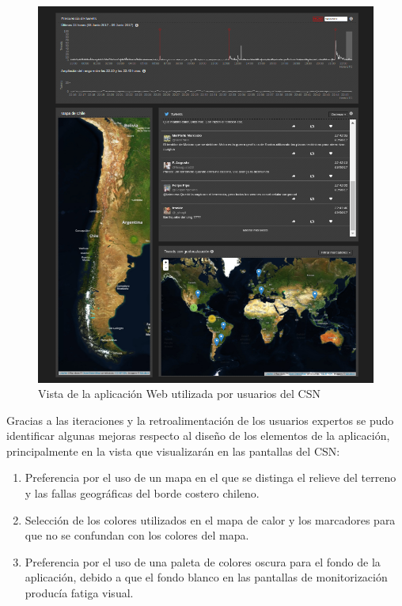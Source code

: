 	\begin{figure}[ht]
	  \centering
	  \includegraphics[trim={0 0 0 0}, clip, width=\textwidth]{imagenes/aplicacionexplorar_csn.png}
	  \caption{Vista de la aplicación Web utilizada por usuarios del CSN}
	\label{fig:webapp_csn}
	\end{figure}


Gracias a las iteraciones y la retroalimentación de los usuarios expertos se pudo identificar algunas mejoras respecto al diseño de los elementos de la aplicación, principalmente en la vista que visualizarán en las pantallas del CSN:

\begin{enumerate}
\item Preferencia por el uso de un mapa en el que se distinga el relieve del terreno y las fallas geográficas del borde costero chileno.
\item Selección de los colores utilizados en el mapa de calor y los marcadores para que no se confundan con los colores del mapa. 
\item Preferencia por el uso de una paleta de colores oscura para el fondo de la aplicación, debido a que el fondo blanco en las pantallas de monitorización producía fatiga visual.
\end{enumerate}


